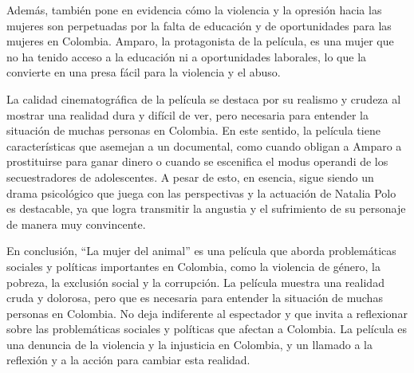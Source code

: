 \documentclass[letterpaper, 12pt]{report}
\begin{document}
Además, también pone en evidencia cómo la violencia y la
opresión hacia las mujeres son perpetuadas por la falta de
educación y de oportunidades para las mujeres en Colombia.
Amparo, la protagonista de la película, es una mujer que no
ha tenido acceso a la educación ni a oportunidades
laborales, lo que la convierte en una presa fácil para la
violencia y el abuso.



La calidad cinematográfica de la película se destaca por su
realismo y crudeza al mostrar una realidad dura y difícil
de ver, pero necesaria para entender la situación de muchas
personas en Colombia. En este sentido, la película tiene
características que asemejan a un documental, como cuando
obligan a Amparo a prostituirse para ganar dinero o cuando
se escenifica el modus operandi de los secuestradores de
adolescentes. A pesar de esto, en esencia, sigue siendo un
drama psicológico que juega con las perspectivas y la
actuación de Natalia Polo es destacable, ya que logra
transmitir la angustia y el sufrimiento de su personaje de
manera muy convincente.

En conclusión, ``La mujer del animal'' es una película que
aborda problemáticas sociales y políticas importantes en
Colombia, como la violencia de género, la pobreza, la
exclusión social y la corrupción. La película muestra una
realidad cruda y dolorosa, pero que es necesaria para
entender la situación de muchas personas en Colombia. No
deja indiferente al espectador y que invita a reflexionar
sobre las problemáticas sociales y políticas que afectan a
Colombia. La película es una denuncia de la violencia y la
injusticia en Colombia, y un llamado a la reflexión y a la
acción para cambiar esta realidad.

\newpage

\printbibliography
% 
\end{document}
